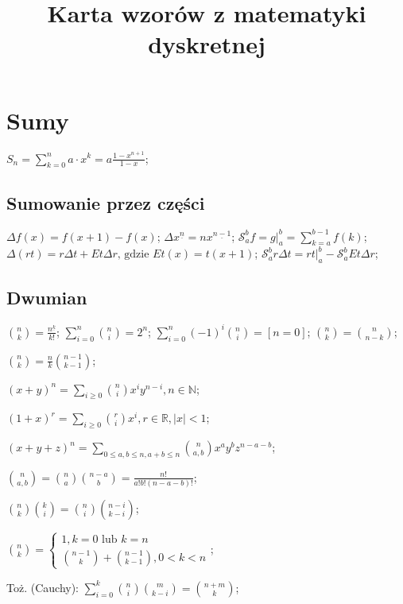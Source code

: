 \documentclass[10pt,a4paper,twocolumn]{article}
\title{Karta wzorów z matematyki dyskretnej}
\begin{document}


\section{Sumy}

${S_n = \sum^{n}_{k = 0} a \cdot x^k} = {a \frac{1 - x^{n+1}}{1 - x}}$;

\subsection{Sumowanie przez części}

${\Delta f(x) = f(x + 1) - f(x)}$;
${\Delta x^{\underline{n}}} = {n x^{\underline{n - 1}}}$;
${\mathcal{S}^{b}_{a} f}={g |^b_a} = {\sum^{b - 1}_{k = a} f(k)}$;
${\Delta (rt)} = {r \Delta t + E t \Delta r \text{, gdzie } E t(x)} =
  {t(x + 1)}$;
${\mathcal{S}^{b}_{a} r \Delta t}= {r t |^b_a - \mathcal{S}^b_a E t \Delta r}$;

\subsection{Dwumian}

${\binom{n}{k} = {\frac{n^{\underline{k}}}{k!}}}$;
${\sum_{i = 0}^n \binom{n}{i} = 2^n}$;
${\sum_{i = 0}^{n} (-1)^i \binom{n}{i} = [ n = 0 ]}$;
$\binom{n}{k} = \binom{n}{n - k}$;

$\binom{n}{k} = \frac{n}{k} \binom{n - 1}{k - 1}$;

${(x + y)^n = \sum_{i \geq 0} \binom{n}{i} x^i y^{n-i}, n \in \mathbb{N}}$;

${(1 + x)^r = \sum_{i \geq 0} \binom{r}{i} x^i, r \in \mathbb{R}, |x| < 1}$;

$(x + y + z)^n =
  \sum_{0 \leq a, b \leq n, a+b \leq n} \binom{n}{a,b} x^a y^b z^{n-a-b}$;

$\binom{n}{a,b} = \binom{n}{a}\binom{n-a}{b} = \frac{n!}{a! b! (n - a - b)!}$;

$\binom{n}{k}\binom{k}{i} = \binom{n}{i}\binom{n-i}{k-i}$;

$\binom{n}{k} = \begin{cases}
    1, k = 0 \text{ lub } k = n \\
    \binom{n - 1}{k} + \binom{n - 1}{k - 1}, 0 < k < n
\end{cases}
$;

Toż. (Cauchy): $\sum^k_{i=0}\binom{n}{i}\binom{m}{k - i} = \binom{n + m}{k}$;
\end{document}
